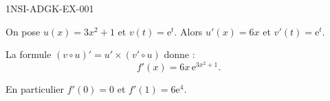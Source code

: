 \begin{corrige}{1NSI-ADGK-EX-001}


On pose $u(x) = 3x^2 + 1$ et $v(t) = \mathrm{e}^t$. Alors $u'(x) = 6x$ et $v'(t) = \mathrm{e}^t$.

La formule $(v \circ u)' = u' \times (v' \circ u)$ donne :
\[ f'(x) = 6x\, \mathrm{e}^{3x^2 + 1}. \]

En particulier $f'(0) = 0$ et $f'(1) = 6\mathrm{e}^4$.

\end{corrige}

